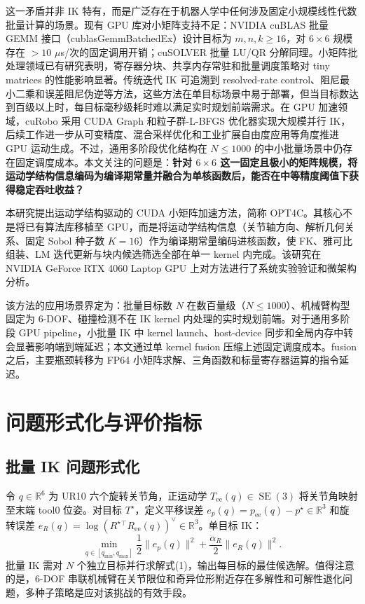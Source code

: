 \documentclass[twocolumn,a4paper,10pt]{ctexart}
\DeclareMathOperator{\SE}{SE}
\newcommand{\R}{\mathbb{R}}
\begin{document}
这一矛盾并非 IK 特有，而是广泛存在于机器人学中任何涉及固定小规模线性代数批量计算的场景。现有 GPU 库对小矩阵支持不足：NVIDIA cuBLAS 批量 GEMM 接口（cublasGemmBatchedEx）设计目标为 $m,n,k\ge16$，对 $6\times6$ 规模存在 $>10$ $\mu$s/次的固定调用开销；cuSOLVER 批量 LU/QR 分解同理\cite{cuda}。小矩阵批处理领域已有研究表明，寄存器分块、共享内存常驻和批量调度策略对 tiny matrices 的性能影响显著\cite{abdelfattah2018tiny}。传统迭代 IK 可追溯到 resolved-rate control、阻尼最小二乘和误差阻尼伪逆等方法\cite{whitney1969resolved,wampler1986dls,chan1988edpi,nakamura1986ik,chiaverini1997singularity}，这些方法在单目标场景中易于部署，但当目标数达到百级以上时，每目标毫秒级耗时难以满足实时规划前端需求。在 GPU 加速领域，cuRobo\cite{curobo} 采用 CUDA Graph 和粒子群-L-BFGS 优化器实现大规模并行 IK，后续工作进一步从可变精度、混合采样优化和工业扩展自由度应用等角度推进 GPU 运动生成\cite{hsiao2023vapr,yasutake2025hjcdik,abuelsamen2025industrial}。不过，通用多阶段优化结构在 $N\le1000$ 的中小批量场景中仍存在固定调度成本。本文关注的问题是：\textbf{针对 $6\times6$ 这一固定且极小的矩阵规模，将运动学结构信息编码为编译期常量并融合为单核函数后，能否在中等精度阈值下获得稳定吞吐收益？}

本研究提出运动学结构驱动的 CUDA 小矩阵加速方法，简称 OPT4C。其核心不是将已有算法库移植至 GPU，而是将运动学结构信息（关节轴方向、解析几何关系、固定 Sobol 种子数 $K=16$）作为编译期常量编码进核函数，使 FK、雅可比组装、LM 迭代更新与块内候选筛选全部在单一 kernel 内完成。该研究在 NVIDIA GeForce RTX 4060 Laptop GPU 上对方法进行了系统实验验证和微架构分析。

该方法的应用场景界定为：批量目标数 $N$ 在数百量级（$N\le1000$）、机械臂构型固定为 6-DOF、碰撞检测不在 IK kernel 内处理的实时规划前端。对于通用多阶段 GPU pipeline，小批量 IK 中 kernel launch、host-device 同步和全局内存中转会显著影响端到端延迟；本文通过单 kernel fusion 压缩上述固定调度成本。fusion 之后，主要瓶颈转移为 FP64 小矩阵求解、三角函数和标量寄存器运算的指令延迟。

\section{问题形式化与评价指标}

\subsection{批量 IK 问题形式化}

令 $q\in\R^6$ 为 UR10 六个旋转关节角，正运动学 $T_{\mathrm{ee}}(q)\in\SE(3)$ 将关节角映射至末端 tool0 位姿。对目标 $T^\star$，定义平移误差 $e_p(q)=p_{\mathrm{ee}}(q)-p^\star\in\R^3$ 和旋转误差 $e_R(q)=\log(R^\star{}^\top R_{\mathrm{ee}}(q))^\vee\in\R^3$。单目标 IK：
\begin{equation}
\min_{q\in[q_{\min},q_{\max}]}\frac{1}{2}\|e_p(q)\|^2+\frac{\alpha_R}{2}\|e_R(q)\|^2.
\end{equation}
批量 IK 需对 $N$ 个独立目标并行求解式(1)，输出每目标的最佳候选解。值得注意的是，6-DOF 串联机械臂在关节限位和奇异位形附近存在多解性和可解性退化问题\cite{nakamura1986ik}，多种子策略是应对该挑战的有效手段。
\end{document}
